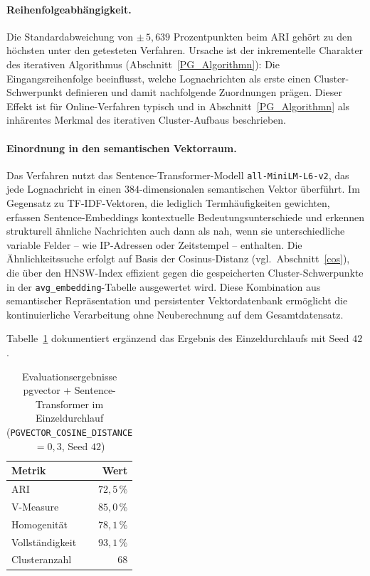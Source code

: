 \paragraph{Reihenfolgeabhängigkeit.}
Die Standardabweichung von $\pm\,5{,}639$ Prozentpunkten beim ARI gehört zu
den höchsten unter den getesteten Verfahren. Ursache ist der inkrementelle
Charakter des iterativen Algorithmus (Abschnitt~\ref{PG_Algorithmn}): Die
Eingangsreihenfolge beeinflusst, welche Lognachrichten als erste einen
Cluster-Schwerpunkt definieren und damit nachfolgende Zuordnungen prägen.
Dieser Effekt ist für Online-Verfahren typisch und in
Abschnitt~\ref{PG_Algorithmn} als inhärentes Merkmal des iterativen
Cluster-Aufbaus beschrieben.


\paragraph{Einordnung in den semantischen Vektorraum.}
Das Verfahren nutzt das Sentence-Transformer-Modell \texttt{all-MiniLM-L6-v2}, das jede
Lognachricht in einen $384$-dimensionalen semantischen Vektor überführt. Im Gegensatz zu
TF-IDF-Vektoren, die lediglich Termhäufigkeiten gewichten, erfassen Sentence-Embeddings
kontextuelle Bedeutungsunterschiede und erkennen strukturell ähnliche Nachrichten auch
dann als nah, wenn sie unterschiedliche variable Felder – wie IP-Adressen oder Zeitstempel –
enthalten. Die Ähnlichkeitssuche erfolgt auf Basis der Cosinus-Distanz (vgl.\
Abschnitt~\ref{cos}), die über den HNSW-Index effizient gegen die gespeicherten
Cluster-Schwerpunkte in der \texttt{avg\_embedding}-Tabelle ausgewertet wird. Diese
Kombination aus semantischer Repräsentation und persistenter Vektordatenbank ermöglicht
die kontinuierliche Verarbeitung ohne Neuberechnung auf dem Gesamtdatensatz.

Tabelle~\ref{tab:eval:pgvector:single} dokumentiert ergänzend das Ergebnis des
Einzeldurchlaufs mit Seed $42$.

\begin{table}[h]
    \centering
    \caption{Evaluationsergebnisse pgvector + Sentence-Transformer im Einzeldurchlauf
             (\texttt{PGVECTOR\_COSINE\_DISTANCE} $= 0{,}3$, Seed $42$)}
    \label{tab:eval:pgvector:single}
    \begin{tabular}{lr}
        \toprule
        Metrik & Wert \\
        \midrule
        ARI             & $72{,}5\,\%$ \\
        V-Measure       & $85{,}0\,\%$ \\
        Homogenität     & $78{,}1\,\%$ \\
        Vollständigkeit & $93{,}1\,\%$ \\
        \midrule
        Clusteranzahl   & $68$ \\
        \bottomrule
    \end{tabular}
\end{table}

